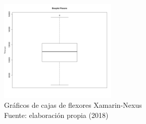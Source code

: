 \begin{figure}[H]
  \begin{center} 
   	\includegraphics[width=0.5\textwidth]{evaluation/graphics/Xamarin/Nexus/BoxplotFlexorsXamarinNexus.png} 
    \caption[Gráficos de cajas de flexores Xamarin-Nexus]{Gráficos de cajas de flexores Xamarin-Nexus\\Fuente: elaboración propia (2018)} 
    \label{fig:xamarin-nexus-boxplot-flexors}
  \end{center}
\end{figure}
